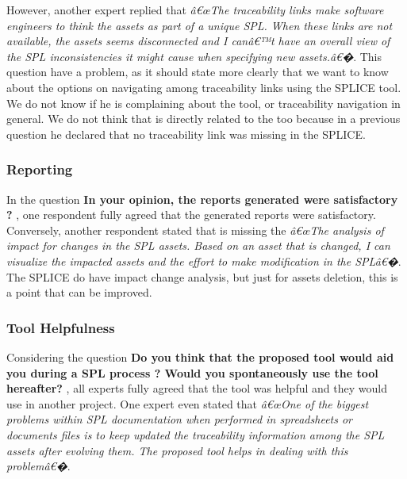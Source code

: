 However, another expert replied that \textit{â€œThe traceability links make software engineers to think the assets as part of a unique SPL. When these links are not available, the assets seems disconnected and I canâ€™t have an overall view of the SPL inconsistencies it might cause when specifying new assets.â€�}. This question have a problem, as it should state more clearly that we want to know about the options on navigating among traceability links using the \ac{SPLICE} tool. We do not know if he is complaining about the tool, or traceability navigation in general. We do not think that is directly related to the too because in a previous question he declared that no traceability link was missing in the \ac{SPLICE}.


\subsubsection{Reporting}
In the  question \textbf{ In your opinion, the reports generated were satisfactory ?} , one respondent fully agreed that the generated reports were satisfactory. Conversely, another respondent stated that is missing the \textit{â€œThe analysis of impact for changes in the SPL assets. Based on an asset that is changed, I can visualize the impacted assets and the effort to make modification in the SPLâ€�}. The \ac{SPLICE} do have impact change analysis, but just for assets deletion, this is a point that can be improved.


\subsubsection{Tool Helpfulness}
Considering the question \textbf{Do you think that the proposed tool would aid you during a SPL process ? Would you spontaneously use the tool hereafter? }, all experts fully agreed that the tool was helpful and they would use in another project. One expert even stated that \textit{â€œOne of the biggest problems within SPL documentation when performed in spreadsheets or documents files is to keep updated the traceability information among the SPL assets after evolving them. The proposed tool helps in dealing with this problemâ€�}.



